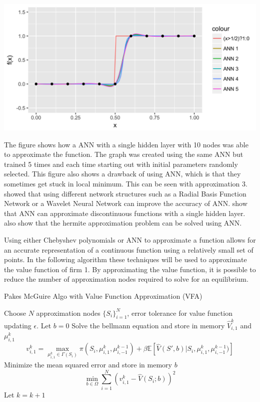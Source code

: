 \documentclass[12pt]{article}
\newcommand{\norm}[1]{\left\lVert#1\right\rVert}
\begin{document}
\includegraphics{plot_ANN_Ind_Func}

The figure shows how a ANN with a single hidden layer with 10 nodes was able to approximate the function. The graph was created using the same ANN but trained 5 times and each time starting out with initial parameters randomly selected. This figure also shows a drawback of using ANN, which is that they sometimes get stuck in local minimum. This can be seen with approximation 3. %
showed that using different network structures such as a Radial Basis Function Network or a Wavelet Neural Network can improve the accuracy of ANN. %
show that ANN can approximate discontinuous functions with a single hidden layer. %
also show that the hermite approximation problem can be solved using ANN.

Using either Chebyshev polynomials or ANN to approximate a function allows for an accurate representation of a continuous function using a relatively small set of points. In the following algorithm these techniques will be used to approximate the value function of firm 1. By approximating the value function, it is possible to reduce the number of approximation nodes required to solve for an equilibrium.

\begin{algorithm}[H]
  \caption{Pakes McGuire Algo with Value Function Approximation (VFA)}
  \begin{algorithmic}[1]
    \Procedure{}{} Choose $N$ approximation nodes $\{S_i\}_{i=1}^N$, error tolerance for value function updating $\epsilon$.
    \State Let $b=0$
    \While{$\norm{\hat{V}^{k}_1-\hat{V}^{k-1}_1} > \frac{\epsilon (1-\beta)}{2\beta}$}
    \State Solve the bellmann equation and store in memory $\hat{V}^k_{i,1}$ and $\mu^k_{i,1}$
    \begin{equation*}
      v^k_{i,1}=\max_{\mu^k_{i,1} \in \Gamma(S_i)} \pi(S_i, \mu^k_{i,1}, \mu^{k-1}_{i,-1})+ \beta\mathbb{E}[\hat{V}(S',b)|S_i,\mu^k_{i,1},\mu^{k-1}_{i,-1})]
    \end{equation*}
    \State Minimize the mean squared error and store in memory $b$
    \begin{equation*}
      \min_{b \in \Omega} \sum_{i=1}^N (v^k_{i,1} - \hat{V}(S_i;b))^2
    \end{equation*}
    \State Let $k=k+1$
    \EndFor
    \EndWhile
    \EndProcedure
  \end{algorithmic}
\end{algorithm}
\end{document}
